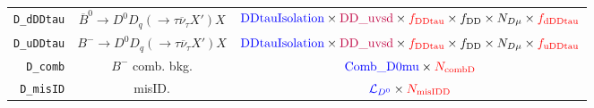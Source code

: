 \begin{landscape}
\begin{table}
\begin{tabular}{r|c|c}
       \texttt{D\_dDDtau} &   $\overline{B}^0 \rightarrow D^0 D_q (\rightarrow \tau \overline{\nu}_\tau X') X$   &                                                                               $\textcolor{blue}{\text{DDtauIsolation}} \times \textcolor{purple}{\text{DD\_uvsd}} \times \textcolor{red}{f_\text{DDtau}} \times f_\text{DD} \times N_{D \mu} \times \textcolor{red}{f_\text{dDDtau}}$                                                                               \\
       \texttt{D\_uDDtau} &        $B^- \rightarrow D^0 D_q (\rightarrow \tau \overline{\nu}_\tau X') X$         &                                                                               $\textcolor{blue}{\text{DDtauIsolation}} \times \textcolor{purple}{\text{DD\_uvsd}} \times \textcolor{red}{f_\text{DDtau}} \times f_\text{DD} \times N_{D \mu} \times \textcolor{red}{f_\text{uDDtau}}$                                                                               \\
         \texttt{D\_comb} &                                   $B^-$ comb. bkg.                                   &                                                                                                                                            $\textcolor{blue}{\text{Comb\_D0mu}} \times \textcolor{red}{N_\text{combD}}$                                                                                                                                             \\
        \texttt{D\_misID} &                                        misID.                                        &                                                                                                                                            $\textcolor{blue}{\mathcal{L}_{D^0}} \times \textcolor{red}{N_\text{misIDD}}$                                                                                                                                            \\
\bottomrule
\end{tabular}

\end{table}
\end{landscape}
\restoregeometry



